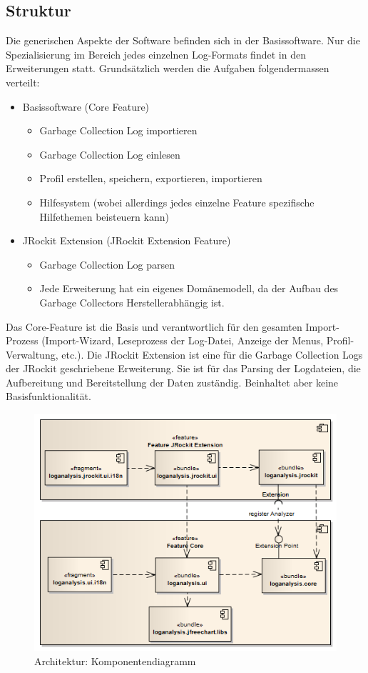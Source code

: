 \subsection{Struktur}\label{projektstruktur}
Die generischen Aspekte der Software befinden sich in der Basissoftware. Nur die Spezialisierung im Bereich jedes einzelnen Log-Formats findet in den Erweiterungen statt. Grundsätzlich werden die Aufgaben folgendermassen verteilt:
\begin{itemize}
	\item Basissoftware (Core Feature)
		\begin{itemize}
			\item Garbage Collection Log importieren
			\item Garbage Collection Log einlesen
			\item Profil erstellen, speichern, exportieren, importieren
			\item Hilfesystem (wobei allerdings jedes einzelne Feature spezifische Hilfethemen beisteuern kann)
		\end{itemize}
	\item JRockit Extension (JRockit Extension Feature)
		\begin{itemize}
			\item Garbage Collection Log parsen
			\item Jede Erweiterung hat ein eigenes Domänemodell, da der Aufbau des Garbage Collectors Herstellerabhängig ist.
		\end{itemize}
\end{itemize}

Das Core-Feature ist die Basis und verantwortlich für den gesamten Import-Prozess (Import-Wizard, Leseprozess der Log-Datei, Anzeige der Menus, Profil-Verwaltung, etc.). Die JRockit Extension ist eine für die Garbage Collection Logs der JRockit geschriebene Erweiterung. Sie ist für das Parsing der Logdateien, die Aufbereitung und Bereitstellung der Daten zuständig. Beinhaltet aber keine Basisfunktionalität.
 \begin{figure}[H]
  	\centering
    	\includegraphics[width=14cm]{images/architektur_komponenten_uebersicht}
        	\caption{Architektur: Komponentendiagramm}
\end{figure}

